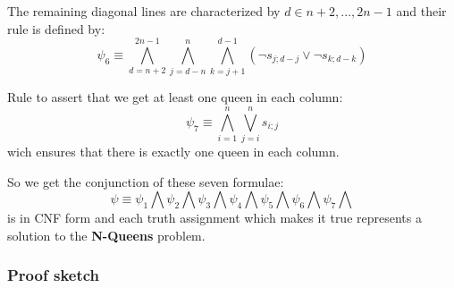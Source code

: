 \noindent The remaining diagonal lines are characterized by $d \in {n+2,...,2n-1}$ and their rule is defined by:
$$\psi_6 \equiv \bigwedge_{d=n+2}^{2n-1}\bigwedge_{j=d-n}^{n}\bigwedge_{k=j+1}^{d-1}(\neg s_{j;d-j} \vee \neg s_{k;d-k})$$

Rule to assert that we get at least one queen in each column:
$$\psi_7 \equiv \bigwedge_{i=1}^{n}\bigvee_{j=i}^{n}s_{i;j}$$
wich ensures that there is exactly one queen in each column.

So we get the conjunction of these seven formulae:
$$\psi \equiv \psi_1\bigwedge\psi_2\bigwedge\psi_3\bigwedge\psi_4\bigwedge\psi_5\bigwedge\psi_6\bigwedge\psi_7\bigwedge$$
is in CNF form and each truth assignment which makes it true represents a solution to the \textbf{N-Queens} problem.

\subsubsection{Proof sketch}
